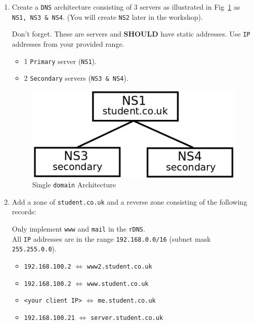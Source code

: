 \documentclass[11pt]{article}
\begin{document}
\begin{enumerate}
    \item Create a \texttt{DNS} architecture consisting of 3 servers as illustrated in Fig~\ref{dnsarch1} as \texttt{NS1, NS3 \& NS4}. (You will create \texttt{NS2} later in the workshop).
        \begin{tcolorbox}[title={\textbf{NOTE:}}]
            \noindent Don't forget. These are servers and \textbf{SHOULD} have static addresses. Use \texttt{IP} addresses from your provided range.
        \end{tcolorbox}
    \begin{itemize}
            \item 1 \texttt{Primary} server (\texttt{NS1}).
            \item 2 \texttt{Secondary} servers (\texttt{NS3 \& NS4}).
        \end{itemize}
        \begin{figure}[ht]
            \begin{center}
              \includegraphics[width=.35\linewidth]{subdomainWS1.png}  
              \caption{Single \texttt{domain} Architecture}
              \label{dnsarch1}
            \end{center}
        \end{figure}
    \item Add a zone of \texttt{student.co.uk} and a reverse zone consisting of the following records:
        \begin{tcolorbox}[title={\textbf{NOTE:}}]
            \noindent Only implement \texttt{www} and \texttt{mail} in the \texttt{rDNS}.\\
            \noindent All \texttt{IP} addresses are in the range \texttt{192.168.0.0/16} (subnet mask \texttt{255.255.0.0}).
        \end{tcolorbox}
        \begin{itemize}
            \item \texttt{192.168.100.2} $\Leftrightarrow$ \texttt{www2.student.co.uk}
            \item \texttt{192.168.100.2} $\Leftrightarrow$ \texttt{www.student.co.uk}
            \item \texttt{<your client IP>} $\Leftrightarrow$ \texttt{me.student.co.uk}
            \item \texttt{192.168.100.21} $\Leftrightarrow$ \texttt{server.student.co.uk}

\end{itemize}
\end{enumerate}
\end{document}
